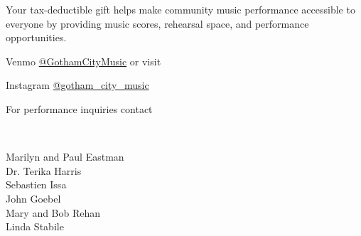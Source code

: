 \documentclass{article}[10pt]
\begin{document}
\begin{center}
\begin{minipage}{4in}
            \begin{center}
            {\textbf{}}
            \end{center}

            \vspace{-0.1in}

            \begin{small}
                Your tax-deductible gift helps make community music performance accessible to everyone by providing music scores, rehearsal space, and performance opportunities.\\
            \end{small}


            Venmo \href{https://account.venmo.com/u/GothamCityMusic}{@GothamCityMusic} or visit \textbf{}

            \begin{center}
            {\textbf{}}

                \faInstagram{}{}  Instagram  \href{https://www.instagram.com/gotham_city_music/}{@gotham\_city\_music}


                For performance inquiries contact
                    {\textbf{}}
            \end{center}

            \begin{center}
            {\textbf{}}
                \\

                \begin{small}
                    \vspace{-0.11in}
                    \begin{multicols*}{2}
                        Marilyn and Paul Eastman\\
                        Dr. Terika Harris\\
                        Sebastien Issa\\
                        John Goebel\\
                        Mary and Bob Rehan\\
                        Linda Stabile
                    \end{multicols*}
                \end{small}
            \end{center}

        \end{minipage}

    \end{center}
\end{document}
